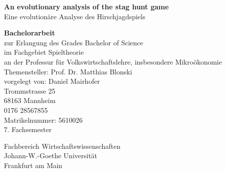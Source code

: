 \begin{titlepage}
    \begin{center}
        \vspace*{5cm}
        \Large 
        \textbf{An evolutionary analysis of the stag hunt game}\\
        \vspace{0.5cm}
        \large
        Eine evolution\"are Analyse des Hirschjagdspiels
        
        \vspace{1.5cm}
        
         \normalsize
         \textbf{Bachelorarbeit} \\
         zur Erlangung des Grades Bachelor of Science \\ 
         im Fachgebiet Spieltheorie \\
         an der Professur f\"ur Volkswirtschaftslehre, insbesondere
         Mikro\"okonomie \\
        \vspace{0.8cm}
        Themensteller: Prof. Dr. Matthias Blonski \\
        vorgelegt von: 
        Daniel Mairhofer \\
        Trommstrasse 25  \\ 
        68163 Mannheim  \\
        0176 28567855 \\
        Matrikelnummer: 5610026 \\
        7. Fachsemester
                       
        \vspace{1.5cm}
        
        
        Fachbereich Wirtschaftswissenschaften\\
        Johann-W.-Goethe Universit\"at \\
        Frankfurt am Main\\
        
    \end{center}
\end{titlepage}
